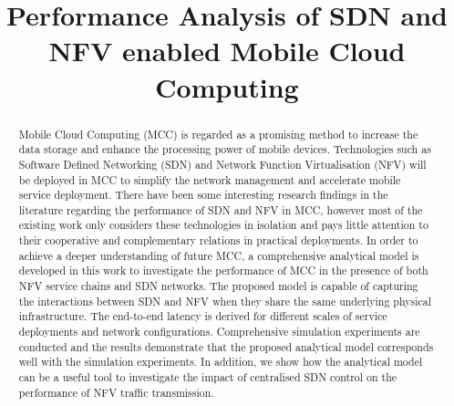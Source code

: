 \documentclass[conference]{IEEEtran}
\begin{document}
\makeatletter
\newcommand\fs@spaceruled{\def\@fs@cfont{\bfseries}\let\@fs@capt\floatc@ruled
  \def\@fs@pre{\vspace{.5em}\hrule height.8pt depth0pt \kern2pt}%
  \def\@fs@post{\kern2pt\hrule\relax}%
  \def\@fs@mid{\kern2pt\hrule\kern2pt}%
  \let\@fs@iftopcapt\iftrue}
\makeatother

\title{Performance Analysis of SDN and NFV enabled Mobile Cloud Computing}

\author{
}
 
\maketitle

\begin{abstract}
Mobile Cloud Computing (MCC) is regarded as a promising method to increase the data storage and enhance the processing power of mobile devices. Technologies such as Software Defined Networking (SDN) and Network Function Virtualisation (NFV) will be deployed in MCC to simplify the network management and accelerate mobile service deployment. There have been some interesting research findings in the literature regarding the performance of SDN and NFV in MCC, however most of the existing work only considers these technologies in isolation and pays little attention to their cooperative and complementary relations in practical deployments. In order to achieve a deeper understanding of future MCC, a comprehensive analytical model is developed in this work to investigate the performance of MCC in the presence of both NFV service chains and SDN networks. The proposed model is capable of capturing the interactions between SDN and NFV when they share the same underlying physical infrastructure. The end-to-end latency is derived for different scales of service deployments and network configurations. Comprehensive simulation experiments are conducted and the results demonstrate that the proposed analytical model corresponds well with the simulation experiments. In addition, we show how the analytical model can be a useful tool to investigate the impact of centralised SDN control on the performance of NFV traffic transmission. 
\end{abstract}













\end{document}
